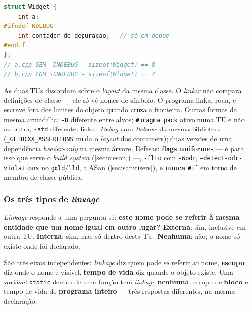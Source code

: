 \begin{armadilha}
\begin{lstlisting}[style=bt, language=C++, frame=none,
                   xleftmargin=0pt, xrightmargin=0pt]
struct Widget {
    int a;
#ifndef NDEBUG
    int contador_de_depuracao;   // só em debug
#endif
};
// a.cpp SEM -DNDEBUG → sizeof(Widget) == 8
// b.cpp COM -DNDEBUG → sizeof(Widget) == 4
\end{lstlisting}
As duas TUs discordam sobre o \emph{layout} da mesma classe. O \emph{linker} não
compara definições de classe --- ele só vê nomes de símbolo. O programa linka,
roda, e escreve fora dos limites do objeto quando cruza a fronteira. Outras
formas da mesma armadilha: \texttt{-D} diferente entre alvos;
\texttt{\#pragma pack} ativo numa TU e não na outra; \texttt{-std} diferente;
linkar \emph{Debug} com \emph{Release} da mesma biblioteca
(\texttt{\_GLIBCXX\_ASSERTIONS} muda o \emph{layout} dos containers); duas
versões de uma dependência \emph{header-only} na mesma árvore. Defesas:
\textbf{flags uniformes} --- é para isso que serve o \emph{build system}
(\cref{sec:meson}) ---, \texttt{-flto} com \texttt{-Wodr},
\texttt{--detect-odr-violations} no \texttt{gold}/\texttt{lld}, o ASan
(\cref{sec:sanitizers}), e \textbf{nunca} \texttt{\#if} em torno de membro de
classe pública.
\end{armadilha}

\subsubsection{Os três tipos de \emph{linkage}}

\emph{Linkage} responde a uma pergunta só: \textbf{este nome pode se referir à
mesma entidade que um nome igual em outro lugar?} \textbf{Externa}: sim,
inclusive em outra TU. \textbf{Interna}: sim, mas só dentro desta TU.
\textbf{Nenhuma}: não; o nome só existe onde foi declarado.

\begin{regra}
São três eixos independentes: \emph{linkage} diz quem pode se referir ao nome,
\textbf{escopo} diz onde o nome é visível, \textbf{tempo de vida} diz quando o
objeto existe. Uma variável \texttt{static} dentro de uma função tem
\emph{linkage} \textbf{nenhuma}, escopo de \textbf{bloco} e tempo de vida do
\textbf{programa inteiro} --- três respostas diferentes, na mesma declaração.
\end{regra}


